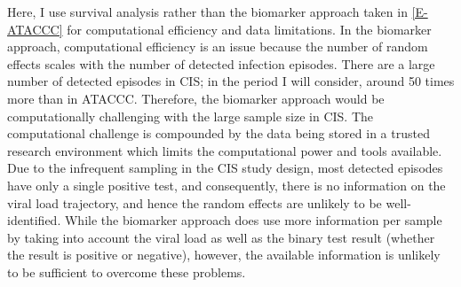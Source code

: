\documentclass[thesis.tex]{subfiles}
\begin{document}
Here, I use survival analysis rather than the biomarker approach taken in \autoref{E-ATACCC} for computational efficiency and data limitations.
In the biomarker approach, computational efficiency is an issue because the number of random effects scales with the number of detected infection episodes.
There are a large number of detected episodes in CIS; in the period I will consider, around 50 times more than in ATACCC.
Therefore, the biomarker approach would be computationally challenging with the large sample size in CIS.
The computational challenge is compounded by the data being stored in a trusted research environment which limits the computational power and tools available.
Due to the infrequent sampling in the CIS study design, most detected episodes have only a single positive test, and consequently,
there is no information on the viral load trajectory, and hence the random effects are unlikely to be well-identified.
While the biomarker approach does use more information per sample by taking into account the viral load as well as the binary test result (\ie whether the result is positive or negative), however, the available information is unlikely to be sufficient to overcome these problems.
\end{document}
